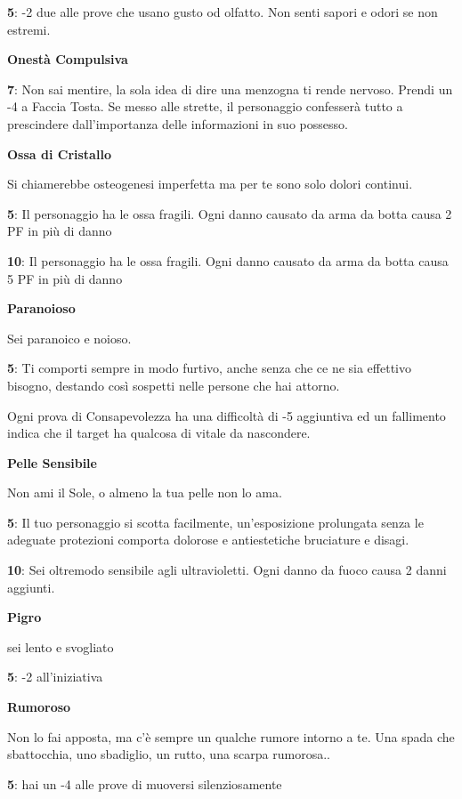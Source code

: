\documentclass[a4paper,11pt,twoside,openany]{book}
\begin{document}
\textbf{5}: -2 due alle prove che usano gusto od olfatto. Non senti sapori e odori se non estremi.

\textbf{Onestà Compulsiva}

\textbf{7}: Non sai mentire, la sola idea di dire una menzogna ti rende nervoso. Prendi un -4 a Faccia Tosta. Se messo alle strette, il personaggio confesserà tutto a prescindere dall'importanza delle informazioni in suo possesso.

\textbf{Ossa di Cristallo}

Si chiamerebbe osteogenesi imperfetta ma per te sono solo dolori continui.

\textbf{5}: Il personaggio ha le ossa fragili. Ogni danno causato da arma da botta causa 2 PF in più di danno

\textbf{10}: Il personaggio ha le ossa fragili. Ogni danno causato da arma da botta causa 5 PF in più di danno

\textbf{Paranoioso}

Sei paranoico e noioso.

\textbf{5}: Ti comporti sempre in modo furtivo, anche senza che ce ne sia effettivo bisogno, destando così sospetti nelle persone che hai attorno.

Ogni prova di Consapevolezza ha una difficoltà di -5 aggiuntiva ed un fallimento indica che il target ha qualcosa di vitale da nascondere.

\textbf{Pelle Sensibile}

Non ami il Sole, o almeno la tua pelle non lo ama.

\textbf{5}: Il tuo personaggio si scotta facilmente, un'esposizione prolungata senza le adeguate protezioni comporta dolorose e antiestetiche bruciature e disagi.

\textbf{10}: Sei oltremodo sensibile agli ultravioletti. Ogni danno da fuoco causa 2 danni aggiunti.

\textbf{Pigro}

sei lento e svogliato

\textbf{5}: -2 all'iniziativa

\textbf{Rumoroso}

Non lo fai apposta, ma c'è sempre un qualche rumore intorno a te. Una spada che sbattocchia, uno sbadiglio, un rutto, una scarpa rumorosa..

\textbf{5}: hai un -4 alle prove di muoversi silenziosamente
\end{document}

